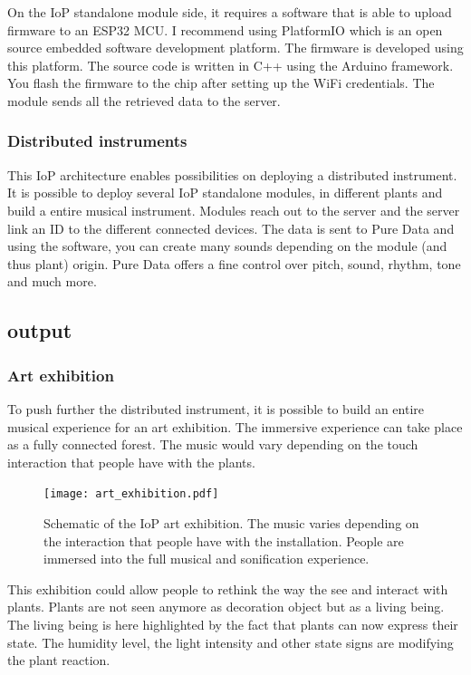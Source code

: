 On the IoP standalone module side, it requires a software that is able to upload 
firmware to an ESP32 MCU. I recommend using PlatformIO which is an open source 
embedded software development platform. The firmware is developed using this platform.
The source code is written in C++ using the Arduino framework. You flash the firmware
to the chip after setting up the WiFi credentials.
The module sends all the retrieved data to the server.

\subsubsection{Distributed instruments}

This IoP architecture enables possibilities on deploying a distributed instrument.
It is possible to deploy several IoP standalone modules, in different plants and build a entire musical instrument.
Modules reach out to the server and the server link an ID to the different connected devices.
The data is sent to Pure Data and using the software, you can create many sounds depending on the 
module (and thus plant) origin. Pure Data offers a fine control over pitch, sound, rhythm, tone and much more.

\subsection{output}

\subsubsection{Art exhibition}

To push further the distributed instrument, it is possible to build an entire 
musical experience for an art exhibition.
The immersive experience can take place as a fully connected forest. The music would vary
depending on the touch interaction that people have with the plants.

\begin{figure}[h!]
    \centering
    \texttt{[image: art\_exhibition.pdf]}
    \caption{Schematic of the IoP art exhibition. The music varies depending on the 
    interaction that people have with the installation. People are immersed into the full
    musical and sonification experience.} 
    \vspace{0.1cm}
    \label{fig:art_exhibition}
\end{figure}

This exhibition could allow people to rethink the way the see and interact with plants.
Plants are not seen anymore as decoration object but as a living being.
The living being is here highlighted by the fact that plants can now express their state.
The humidity level, the light intensity and other state signs are modifying the plant 
reaction.


